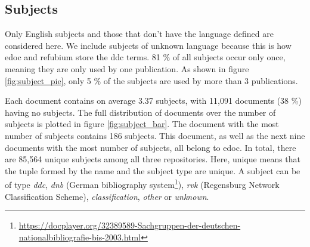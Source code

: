 \subsection{Subjects} \label{repo_analysis_subjects}

Only English subjects and those that don't have the language defined are considered here. We include subjects of unknown language because this is how edoc and refubium store the \acrshort{ddc} terms. 81 \% of all subjects occur only once, meaning they are only used by one publication. As shown in figure \ref{fig:subject_pie}, only 5 \% of the subjects are used by more than 3 publications.

Each document contains on average 3.37 subjects, with 11,091 documents (38 \%) having no subjects. The full distribution of documents over the number of subjects is plotted in figure \ref{fig:subject_bar}. The document with the most number of subjects contains 186 subjects. This document, as well as the next nine documents with the most number of subjects, all belong to edoc. In total, there are 85,564 unique subjects among all three repositories. Here, unique means that the tuple formed by the name and the subject type are unique. A subject can be of type \textit{ddc}, \textit{dnb} (German bibliography system\footnote{\url{https://docplayer.org/32389589-Sachgruppen-der-deutschen-nationalbibliografie-bis-2003.html}}), \textit{rvk} (Regensburg Network Classification Scheme), \textit{classification}, \textit{other} or \textit{unknown}.

